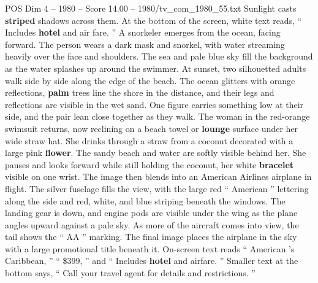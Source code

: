 \begin{textsample}{POS Dim 4 – 1980 – Score 14.00 – 1980/tv\_com\_1980\_55.txt}
Sunlight casts \textbf{striped} shadows across them.
At the bottom of the screen, white text reads, “ Includes \textbf{hotel} and air fare. ” A snorkeler emerges from the ocean, facing forward.
The person wears a dark mask and snorkel, with water streaming heavily over the face and shoulders.
The sea and pale blue sky fill the background as the water splashes up around the swimmer.
At sunset, two silhouetted adults walk side by side along the edge of the beach.
The ocean glitters with orange reflections, \textbf{palm} trees line the shore in the distance, and their legs and reflections are visible in the wet sand.
One figure carries something low at their side, and the pair lean close together as they walk.
The woman in the red-orange swimsuit returns, now reclining on a beach towel or \textbf{lounge} surface under her wide straw hat.
She drinks through a straw from a coconut decorated with a large pink \textbf{flower}.
The sandy beach and water are softly visible behind her.
She pauses and looks forward while still holding the coconut, her white \textbf{bracelet} visible on one wrist.
The image then blends into an American Airlines airplane in flight.
The silver fuselage fills the view, with the large red “ American ” lettering along the side and red, white, and blue striping beneath the windows.
The landing gear is down, and engine pods are visible under the wing as the plane angles upward against a pale sky.
As more of the aircraft comes into view, the tail shows the “ AA ” marking.
The final image places the airplane in the sky with a large promotional title beneath it.
On-screen text reads “ American ’s Caribbean, ” “ \$399, ” and “ Includes \textbf{hotel} and airfare. ” Smaller text at the bottom says, “ Call your travel agent for details and restrictions. ”

\end{textsample}
